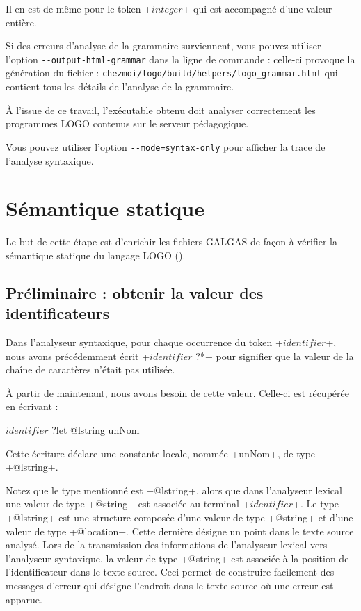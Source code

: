Il en est de même pour le token \ggs+$integer$+ qui est accompagné d’une valeur entière.

Si des erreurs d'analyse de la grammaire surviennent, vous pouvez utiliser l'option \texttt{-{}-output-html-grammar} dans la ligne de commande : celle-ci provoque la génération du fichier : \texttt{chezmoi/logo/build/helpers/logo\_grammar.html} qui contient tous les détails de l'analyse de la grammaire.

À l'issue de ce travail, l'exécutable obtenu doit analyser correctement les programmes LOGO contenus sur le serveur pédagogique.

Vous pouvez utiliser l'option \texttt{-{}-mode=syntax-only} pour afficher la trace de l'analyse syntaxique.

\section{Sémantique statique}

Le but de cette étape est d'enrichir les fichiers GALGAS de façon à vérifier la sémantique statique du langage LOGO ().

\subsection{Préliminaire : obtenir la valeur des identificateurs}

Dans l’analyseur syntaxique, pour chaque occurrence du token \ggs+$identifier$+, nous avons précédemment écrit \ggs+$identifier$ ?*+ pour signifier que la valeur de la chaîne de caractères n’était pas utilisée.

À partir de maintenant, nous avons besoin de cette valeur. Celle-ci est récupérée en écrivant :

\begin{galgas}
$identifier$ ?let @lstring unNom
\end{galgas}


Cette écriture déclare une constante locale, nommée \ggs+unNom+, de type \ggs+@lstring+.

Notez que le type mentionné est \ggs+@lstring+, alors que dans l’analyseur lexical une valeur de type \ggs+@string+ est associée au terminal \ggs+$identifier$+. Le type \ggs+@lstring+ est une structure composée d’une valeur de type \ggs+@string+ et d’une valeur de type \ggs+@location+. Cette dernière désigne un point dans le texte source analysé. Lors de la transmission des informations de l’analyseur lexical vers l’analyseur syntaxique, la valeur de type \ggs+@string+ est associée à la position de l’identificateur dans le texte source. Ceci permet de construire facilement des messages d’erreur qui désigne l’endroit dans le texte source où une erreur est apparue.

